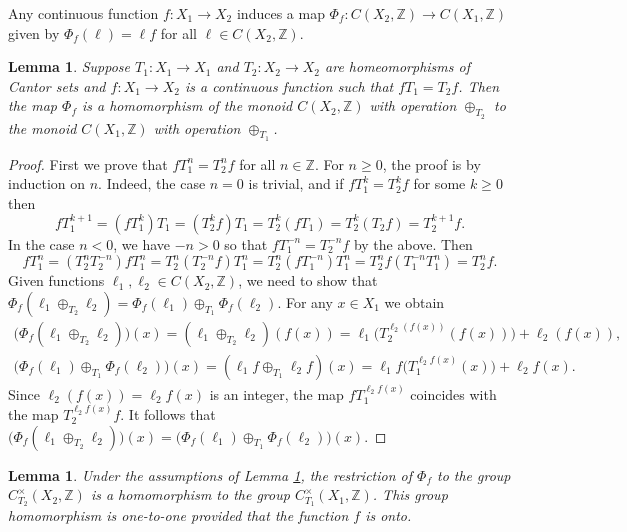 \documentclass[12pt]{article}
\newtheorem{lemma}[theorem]{Lemma}
\theoremstyle{definition}
\def\bZ{\mathbb{Z}}
\begin{document}
Any continuous function $f:X_1\to X_2$ induces a map $\Phi_f:C(X_2,\bZ)\to 
C(X_1,\bZ)$ given by $\Phi_f(\ell)=\ell f$ for all $\ell\in C(X_2,\bZ)$.

\begin{lemma}\label{monoid-embed}
Suppose $T_1:X_1\to X_1$ and $T_2:X_2\to X_2$ are homeomorphisms of Cantor 
sets and $f:X_1\to X_2$ is a continuous function such that $fT_1=T_2f$.  
Then the map $\Phi_f$ is a homomorphism of the monoid $C(X_2,\bZ)$ with 
operation $\oplus_{T_2}$ to the monoid $C(X_1,\bZ)$ with operation 
$\oplus_{T_1}$.
\end{lemma}

\begin{proof}
First we prove that $fT_1^n=T_2^nf$ for all $n\in\bZ$.  For $n\ge0$, the 
proof is by induction on $n$.  Indeed, the case $n=0$ is trivial, and if 
$fT_1^k=T_2^kf$ for some $k\ge0$ then
\[
fT_1^{k+1}=(fT_1^k)T_1=(T_2^kf)T_1=T_2^k(fT_1)=T_2^k(T_2f)=T_2^{k+1}f.
\]
In the case $n<0$, we have $-n>0$ so that $fT_1^{-n}=T_2^{-n}f$ by the 
above.  Then
\[
fT_1^n=(T_2^nT_2^{-n})fT_1^n=T_2^n(T_2^{-n}f)T_1^n=T_2^n(fT_1^{-n})T_1^n
=T_2^nf(T_1^{-n}T_1^n)=T_2^nf.
\]
Given functions $\ell_1,\ell_2\in C(X_2,\bZ)$, we need to show that 
$\Phi_f(\ell_1\oplus_{T_2}\ell_2)=\Phi_f(\ell_1)\oplus_{T_1} 
\Phi_f(\ell_2)$.  For any $x\in X_1$ we obtain
\begin{gather*}
\bigl(\Phi_f(\ell_1\oplus_{T_2}\ell_2)\bigr)(x)=
(\ell_1\oplus_{T_2}\ell_2)(f(x))=
\ell_1\bigl(T_2^{\ell_2(f(x))}(f(x))\bigr)+\ell_2(f(x)), \\
\bigl(\Phi_f(\ell_1)\oplus_{T_1}\Phi_f(\ell_2)\bigr)(x)=
(\ell_1f\oplus_{T_1}\ell_2f)(x)=
\ell_1f\bigl(T_1^{\ell_2f(x)}(x)\bigr)+\ell_2f(x).
\end{gather*}
Since $\ell_2(f(x))=\ell_2f(x)$ is an integer, the map $fT_1^{\ell_2f(x)}$ 
coincides with the map $T_2^{\ell_2f(x)}f$.  It follows that 
$\bigl(\Phi_f(\ell_1\oplus_{T_2}\ell_2)\bigr)(x)= 
\bigl(\Phi_f(\ell_1)\oplus_{T_1}\Phi_f(\ell_2)\bigr)(x)$.
\end{proof}

\begin{lemma}\label{group-embed}
Under the assumptions of Lemma \ref{monoid-embed}, the restriction of 
$\Phi_f$ to the group $C^\times_{T_2}(X_2,\bZ)$ is a homomorphism to the 
group $C^\times_{T_1}(X_1,\bZ)$.  This group homomorphism is one-to-one 
provided that the function $f$ is onto.
\end{lemma}
\end{document}
